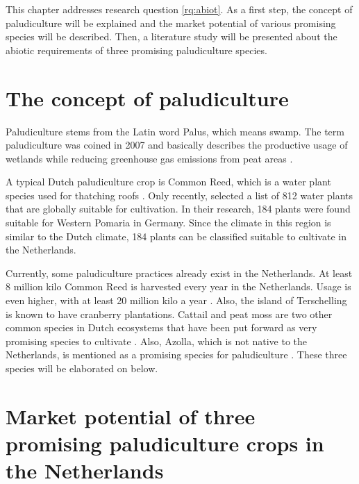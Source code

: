 {This chapter addresses research question \ref{rq:abiot}. As a first step, the concept of paludiculture will be explained and the market potential of various promising species will be described. Then, a literature study will be presented about the abiotic requirements of three promising paludiculture species.

\section{The concept of paludiculture}

Paludiculture stems from the Latin word Palus, which means swamp. The term paludiculture was coined in 2007 and basically describes the productive usage of wetlands while reducing greenhouse gas emissions from peat areas \citep{wichtmann2007paludiculture}. 

A typical Dutch paludiculture crop is Common Reed, which is a water plant species used for thatching roofs \citep{wichtmann2016paludiculture}. Only recently, \citet{abel2013database} selected a list of 812 water plants that are globally suitable for cultivation. In their research, 184 plants were found suitable for Western Pomaria in Germany. Since the climate in this region is similar to the Dutch climate, 184 plants can be classified suitable to cultivate in the Netherlands. 

Currently, some paludiculture practices already exist in the Netherlands. At least 8 million kilo Common Reed is harvested every year in the Netherlands. Usage is even higher, with at least 20 million kilo a year \citep{wichtmann2016paludiculture}. Also, the island of Terschelling is known to have cranberry plantations. Cattail and peat moss are two other common species in Dutch ecosystems that have been put forward as very promising species to cultivate \citep{abel2013database, van2013werk}. Also, Azolla, which is not native to the Netherlands, is mentioned as a promising species for paludiculture \citep{abel2013database, van2013werk}. 
These three species will be elaborated on below.

\section{Market potential of three promising paludiculture crops in the Netherlands}

}
